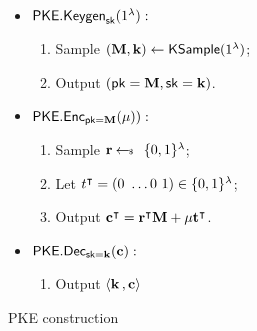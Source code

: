  
 


 
 
 
\begin{figure}
\begin{framed}
\begin{itemize}
\item $\mathsf{PKE.Keygen}_{\mathsf{sk}}(1^{\lambda}):$
\begin{enumerate}
\item Sample $(\mathbf{M}, \mathbf{k}) \gets \mathsf{KSample}(1^{\lambda})$;
\item Output $(\mathsf{pk} = \mathbf{M}, \mathsf{sk} = \mathbf{k})$.
\end{enumerate}
\item $\mathsf{PKE.Enc}_{\mathsf{pk} = \mathbf{M}}(\mu)):$
\begin{enumerate}
\item Sample $\r \sample \bit^{\lambda}$;
\item Let ${t}^{\intercal} = (0 \ \dots 0 \ 1) \in \{0, 1\}^{\lambda}$;
\item Output ${\mathbf{c}}^{\intercal} = {\mathbf{r}}^{\intercal}  \mathbf{M} + \mu{\mathbf{t}}^{\intercal}$.
\end{enumerate}
\item $\mathsf{PKE.Dec}_{\mathsf{sk} = \mathbf{k} }(\mathbf{c}):$
\begin{enumerate}
\item Output $\langle \mathbf{k} \, , \mathbf{c} \rangle$
\end{enumerate}

\end{itemize}
\end{framed}
\caption{PKE construction \cite{fgcrypto}}
\label{fig:pke-dvv16}
\end{figure}



